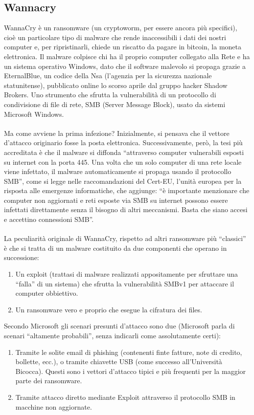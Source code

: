 \documentclass{article}
\begin{document}
\subsection{Wannacry}
WannaCry è un ransomware (un cryptoworm, per essere ancora più specifici), cioè un particolare tipo di malware che 
rende inaccessibili i dati dei nostri computer e, per ripristinarli, chiede un riscatto da pagare in bitcoin, 
la moneta elettronica. Il malware colpisce chi ha il proprio computer collegato alla Rete e ha un sistema operativo 
Windows, dato che il software malevolo si propaga grazie a EternalBlue, un codice della Nsa (l’agenzia per la 
sicurezza nazionale statunitense), pubblicato online lo scorso aprile dal gruppo hacker Shadow Brokers. 
Uno strumento che sfrutta la vulnerabilità di un protocollo di condivisione di file di rete, SMB (Server Message Block), 
usato da sistemi Microsoft Windows.\\\\
Ma come avviene la prima infezione? Inizialmente, si pensava che il vettore d’attacco originario fosse la posta 
elettronica. Successivamente, però, la tesi più accreditata è che il malware si diffonda “attraverso computer 
vulnerabili esposti su internet con la porta 445. Una volta che un solo computer di una rete locale viene infettato, 
il malware automaticamente si propaga usando il protocollo SMB”, come si legge nelle raccomandazioni del Cert-EU, 
l’unità europea per la risposta alle emergenze informatiche, che aggiunge: “è importante menzionare che computer 
non aggiornati e reti esposte via SMB su internet possono essere infettati direttamente senza il bisogno di altri 
meccanismi. Basta che siano accesi e accettino connessioni SMB”.\\\\
La peculiarità originale di WannaCry, rispetto ad altri ransomware più “classici” è che si tratta di un malware 
costituito da due componenti che operano in successione:
\begin{enumerate}
    \item Un exploit (trattasi di malware realizzati appositamente per sfruttare una “falla” di un sistema) 
    che sfrutta la vulnerabilità SMBv1 per attaccare il computer obbiettivo.
    \item Un ransomware vero e proprio che esegue la cifratura dei files.
\end{enumerate}
Secondo Microsoft gli scenari presunti d’attacco sono due (Microsoft parla di scenari “altamente probabili”, 
senza indicarli come assolutamente certi):
\begin{enumerate}
    \item Tramite le solite email di phishing (contenenti finte fatture, note di credito, bollette, ecc.), 
    o tramite chiavette USB (come successo all’Università Bicocca). Questi sono i vettori d’attacco tipici e 
    più frequenti per la maggior parte dei ransomware.
    \item Tramite attacco diretto mediante Exploit attraverso il protocollo SMB in macchine non aggiornate.
\end{enumerate}
\end{document}

